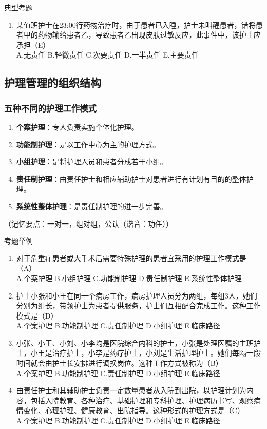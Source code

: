 \documentclass[11pt, a4paper]{ctexart}
\begin{document}
\begin{examplebox}{典型考题}
\begin{enumerate}
    \item 某值班护士在23:00行药物治疗时，由于患者已入睡，护士未叫醒患者，错将患者甲的药物输给患者乙，导致患者乙出现皮肤过敏反应，此事件中，该护士应承担（E）\\
    A.无责任 \quad B.轻微责任 \quad C.次要责任 \quad D.一半责任 \quad E.主要责任
\end{enumerate}
\end{examplebox}

\subsection{护理管理的组织结构}
\subsubsection{五种不同的护理工作模式}
\begin{enumerate}
    \item \textbf{个案护理}：专人负责实施个体化护理。
    \item \textbf{功能制护理}：是以工作中心为主的护理方式。
    \item \textbf{小组护理}：是将护理人员和患者分成若干小组。
    \item \textbf{责任制护理}：由责任护士和相应辅助护士对患者进行有计划有目的的整体护理。
    \item \textbf{系统性整体护理}：是责任制护理的进一步完善。
\end{enumerate}
（记忆要点：一对一，组对组，公认（谐音：功任））

\begin{examplebox}{考题举例}
\begin{enumerate}
    \item 对于危重症患者或大手术后需要特殊护理的患者宜采用的护理工作模式是（A）\\
    A.个案护理 \quad B.小组护理 \quad C.功能制护理 \quad D.责任制护理 \quad E.系统性整体护理
    \item 护士小张和小王在同一个病房工作，病房护理人员分为两组，每组3人，她们分别为组长，带领护士为患者提供服务，护士们互相配合完成工作。这种工作模式是（D）\\
    A.个案护理 \quad B.功能制护理 \quad C.责任制护理 \quad D.小组护理 \quad E.临床路径
    \item 小张、小王、小刘、小李均是医院综合内科的护士，小张是处理医嘱的主班护士，小王是治疗护士，小李是药疗护士，小刘是生活护理护士。她们每隔一段时间就会由护士长安排进行调换岗位。这种工作方式被称为（B）\\
    A.个案护理 \quad B.功能制护理 \quad C.责任制护理 \quad D.小组护理 \quad E.临床路径
    \item 由责任护士和其辅助护士负责一定数量患者从入院到出院，以护理计划为内容，包括入院教育、各种治疗、基础护理和专科护理、护理病历书写、观察病情变化、心理护理、健康教育、出院指导。这种形式的护理方式是（C）\\
    A.个案护理 \quad B.功能制护理 \quad C.责任制护理 \quad D.小组护理 \quad E.临床路径
\end{enumerate}
\end{examplebox}
\end{document}
